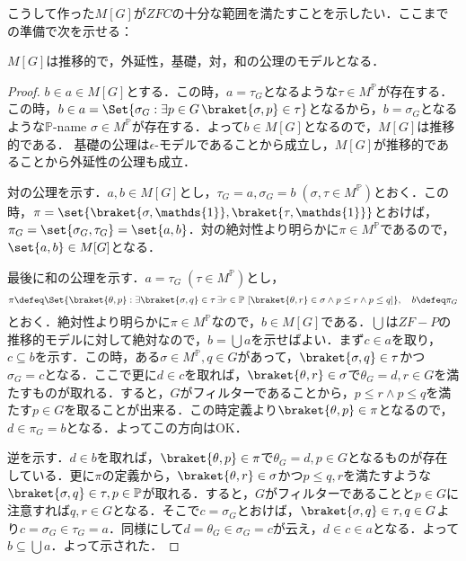 \documentclass[a4j]{ltjsarticle}
\begin{document}
こうして作った$M[G]$が$ZFC$の十分な範囲を満たすことを示したい．ここまでの準備で次を示せる：
\begin{lemma}
 $M[G]$は推移的で，外延性，基礎，対，和の公理のモデルとなる．
\end{lemma}
\begin{proof}
 $b \in a \in M[G]$とする．この時，$a = \tau_G$となるような$\tau \in M^\mathbb{P}$が存在する．この時，$b \in a = \Set{ \sigma_G : \exists p \in G\, \braket{\sigma, p} \in \tau}$となるから，$b = \sigma_G$となるような$\mathbb{P}$-name $\sigma\in M^\mathbb{P}$が存在する．よって$b \in M[G]$となるので，$M[G]$は推移的である．
 基礎の公理は$\epsilon$-モデルであることから成立し，$M[G]$が推移的であることから外延性の公理も成立．

 対の公理を示す．$a, b \in M[G]$とし，$\tau_G = a, \sigma_G = b\;(\sigma, \tau \in M^\mathbb{P})$とおく．この時，$\pi = \set{\braket{\sigma, \mathds{1}}, \braket{\tau, \mathds{1}}}$とおけば，$\pi_G = \set{\sigma_G, \tau_G} = \set{a, b}$．対の絶対性より明らかに$\pi \in M^\mathbb{P}$であるので，$\set{a, b} \in M[G]$となる．

 最後に和の公理を示す．$a = \tau_G\; (\tau \in M^\mathbb{P})$とし，
 \[
  \pi \defeq \Set{ \braket{\theta, p} : \exists \braket{\sigma, q} \in \tau\, \exists r \in \mathbb{P}\, \left[\braket{\theta, r} \in \sigma \wedge p \leq r \wedge p \leq q \right]}, \quad b \defeq \pi_G
 \]
 とおく．絶対性より明らかに$\pi \in M^\mathbb{P}$なので，$b \in M[G]$である．$\bigcup$は$ZF-P$の推移的モデルに対して絶対なので，$b = \bigcup a$を示せばよい．まず$c \in a$を取り，$c \subseteq b$を示す．この時，ある$\sigma \in M^\mathbb{P}, q \in G$があって，$\braket{\sigma, q} \in \tau$かつ$\sigma_G = c$となる．ここで更に$d \in c$を取れば，$\braket{\theta, r} \in \sigma$で$\theta_G = d, r \in G$を満たすものが取れる．すると，$G$がフィルターであることから，$p \leq r \wedge p \leq q$を満たす$p \in G$を取ることが出来る．この時定義より$\braket{\theta, p} \in \pi$となるので，$d \in \pi_G = b$となる．よってこの方向はOK．

 逆を示す．$d \in b$を取れば，$\braket{\theta, p} \in \pi$で$\theta_G = d, p \in G$となるものが存在している．更に$\pi$の定義から，$\braket{\theta, r} \in \sigma$かつ$p \leq q, r$を満たすような$\braket{\sigma, q} \in \tau, p \in \mathbb{P}$が取れる．すると，$G$がフィルターであることと$p \in G$に注意すれば$q, r \in G$となる．そこで$c = \sigma_G$とおけば，$\braket{\sigma, q} \in \tau, q \in G$より$c = \sigma_G \in \tau_G = a$．同様にして$d = \theta_G \in \sigma_G = c$が云え，$d \in c \in a$となる．よって$b \subseteq \bigcup a$．よって示された．
 \mbox{}
\end{proof}
\nocite{Kunen:2011,Eda:2010,Arai:2011}
\printbibliography[title=参考文献]
\end{document}
